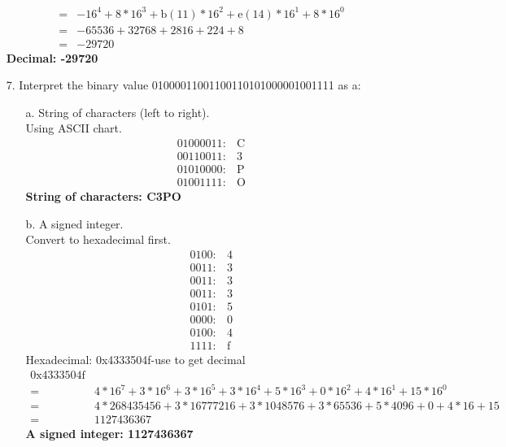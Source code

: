 \documentclass{article}
\begin{document}
\begin{itemize}
\begin{align}
        =&-16^4+8*16^3+\text{b}(11)*16^2+\text{e}(14)*16^1+8*16^0\nonumber\\
        =&-65536+32768+2816+224+8\nonumber\\
        =&-29720\nonumber
    \end{align}
    \textbf{Decimal: -29720}
    \item[7.] Interpret the binary value 01000011001100110101000001001111 as a: 
    \begin{itemize}
        \item[a.] String of characters (left to right).\\
        \hspace*{0.5cm} Using ASCII chart.
        \begin{align}
            01000011: &\text{C}\nonumber\\
            00110011: &3\nonumber\\
            01010000: &\text{P}\nonumber\\
            01001111: &\text{O}\nonumber
        \end{align}
        \textbf{String of characters: C3PO}
        \item[b.] A signed integer.\\
        \hspace*{0.5cm} Convert to hexadecimal first.
        \begin{align}
            0100: &4\nonumber\\
            0011: &3\nonumber\\
            0011: &3\nonumber\\
            0011: &3\nonumber\\
            0101: &5\nonumber\\
            0000: &0\nonumber\\
            0100: &4\nonumber\\
            1111: &\text{f}\nonumber
        \end{align}
        Hexadecimal: 0x4333504f-use to get decimal
        \begin{align}
            0\text{x}4333504\text{f}\nonumber\\
            =&4*16^7+3*16^6+3*16^5+3*16^4+5*16^3+0*16^2+4*16^1+15*16^0\nonumber\\
            =&4*268435456+3*16777216+3*1048576+3*65536+5*4096+0+4*16+15\nonumber\\
            =&1127436367\nonumber
        \end{align}
        \textbf{A signed integer: 1127436367}
    \end{itemize}
\end{itemize}
\end{document}
